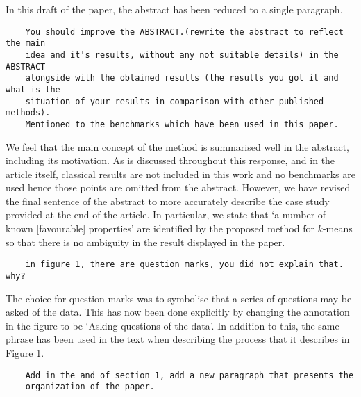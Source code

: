 \documentclass[11pt]{article}
\begin{document}
In this draft of the paper, the abstract has been reduced to a single
paragraph.\\

\begin{tcolorbox}
\begin{verbatim}
    You should improve the ABSTRACT.(rewrite the abstract to reflect the main
    idea and it's results, without any not suitable details) in the ABSTRACT
    alongside with the obtained results (the results you got it and what is the
    situation of your results in comparison with other published methods).
    Mentioned to the benchmarks which have been used in this paper.
\end{verbatim}
\end{tcolorbox}

We feel that the main concept of the method is summarised well in the abstract,
including its motivation. As is discussed throughout this response, and in the
article itself, classical results are not included in this work and no
benchmarks are used hence those points are omitted from the abstract. However,
we have revised the final sentence of the abstract to more accurately describe
the case study provided at the end of the article. In particular, we state that
`a number of known [favourable] properties' are identified by the proposed
method for \(k\)-means so that there is no ambiguity in the result displayed in
the paper.\\

\begin{tcolorbox}
\begin{verbatim}
    in figure 1, there are question marks, you did not explain that. why?
\end{verbatim}
\end{tcolorbox}

The choice for question marks was to symbolise that a series of questions may be
asked of the data. This has now been done explicitly by changing the annotation
in the figure to be `Asking questions of the data'. In addition to this, the
same phrase has been used in the text when describing the process that it
describes in Figure 1.\\

\begin{tcolorbox}
\begin{verbatim}
    Add in the and of section 1, add a new paragraph that presents the
    organization of the paper.
\end{verbatim}
\end{tcolorbox}
\end{document}
